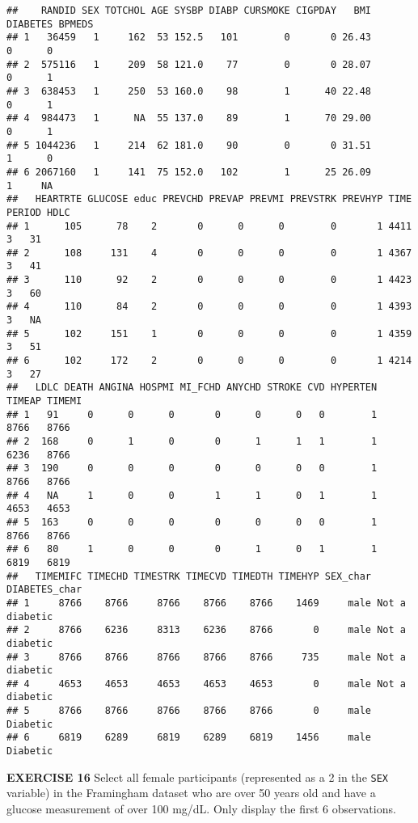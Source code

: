 \documentclass[
]{article}
\begin{document}
\begin{verbatim}
##    RANDID SEX TOTCHOL AGE SYSBP DIABP CURSMOKE CIGPDAY   BMI DIABETES BPMEDS
## 1   36459   1     162  53 152.5   101        0       0 26.43        0      0
## 2  575116   1     209  58 121.0    77        0       0 28.07        0      1
## 3  638453   1     250  53 160.0    98        1      40 22.48        0      1
## 4  984473   1      NA  55 137.0    89        1      70 29.00        0      1
## 5 1044236   1     214  62 181.0    90        0       0 31.51        1      0
## 6 2067160   1     141  75 152.0   102        1      25 26.09        1     NA
##   HEARTRTE GLUCOSE educ PREVCHD PREVAP PREVMI PREVSTRK PREVHYP TIME PERIOD HDLC
## 1      105      78    2       0      0      0        0       1 4411      3   31
## 2      108     131    4       0      0      0        0       1 4367      3   41
## 3      110      92    2       0      0      0        0       1 4423      3   60
## 4      110      84    2       0      0      0        0       1 4393      3   NA
## 5      102     151    1       0      0      0        0       1 4359      3   51
## 6      102     172    2       0      0      0        0       1 4214      3   27
##   LDLC DEATH ANGINA HOSPMI MI_FCHD ANYCHD STROKE CVD HYPERTEN TIMEAP TIMEMI
## 1   91     0      0      0       0      0      0   0        1   8766   8766
## 2  168     0      1      0       0      1      1   1        1   6236   8766
## 3  190     0      0      0       0      0      0   0        1   8766   8766
## 4   NA     1      0      0       1      1      0   1        1   4653   4653
## 5  163     0      0      0       0      0      0   0        1   8766   8766
## 6   80     1      0      0       0      1      0   1        1   6819   6819
##   TIMEMIFC TIMECHD TIMESTRK TIMECVD TIMEDTH TIMEHYP SEX_char  DIABETES_char
## 1     8766    8766     8766    8766    8766    1469     male Not a diabetic
## 2     8766    6236     8313    6236    8766       0     male Not a diabetic
## 3     8766    8766     8766    8766    8766     735     male Not a diabetic
## 4     4653    4653     4653    4653    4653       0     male Not a diabetic
## 5     8766    8766     8766    8766    8766       0     male       Diabetic
## 6     6819    6289     6819    6289    6819    1456     male       Diabetic
\end{verbatim}

\textbf{EXERCISE 16} Select all female participants (represented as a 2
in the \texttt{SEX} variable) in the Framingham dataset who are over 50
years old and have a glucose measurement of over 100 mg/dL. Only display
the first 6 observations.
\end{document}
